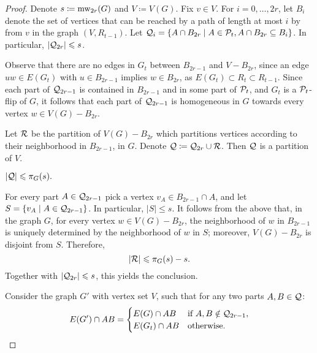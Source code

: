     
        \begin{proof}Denote $s\coloneqq \mw_{2r}(G)$ and $V\coloneqq V(G)$.
            Fix $v\in V$. 
            For $i=0,\ldots,2r$, let 
            $B_i$ denote the set of vertices  that can be reached by a path of length at most $i$ by from $v$ in the graph $(V,R_{t-1})$.
            Let $\cal Q_i=\setof{A\cap B_{2r}}{A\in\cal P_t,A\cap B_{2r}\subset B_i}$.
    In particular, $|\cal Q_{2r}|\le s$.
    
    
    Observe that
    there are no edges in $G_{t}$ between  $B_{2r-1}$ and $V-B_{2r}$,
    since an edge  $uw\in E(G_t)$ with  $u\in B_{2r-1}$  implies $w\in B_{2r}$,
    as $E(G_{t})\subset R_t\subset R_{t-1}$.
    Since each part of $\cal Q_{2r-1}$ is contained in $B_{2r-1}$ and in some part of $\cal P_t$,
     and $G_t$ is a $\cal P_t$-flip of $G$, 
    it follows that each part of $\cal Q_{2r-1}$ is homogeneous in $G$ towards 
    every vertex $w\in V(G)-B_{2r}$.
    
    
    Let $\cal R$ be the partition of $V(G)-B_{2r}$ which partitions vertices according to their neighborhood in $B_{2r-1}$, in $G$.
    Denote $\cal Q\coloneqq \cal Q_{2r}\cup\cal R$. Then $\cal Q$ is a partition of $V$.
    
    \begin{claim}\label{cl:small-q-poly}
        $|\cal Q|\le \pi_G(s).$
       \end{claim}
       \begin{claimproof}
           For every part $A\in \cal Q_{2r-1}$ pick a vertex $v_A\in B_{2r-1}\cap A$,
           and let $S=\setof{v_A}{A\in\cal Q_{2r-1}}$. In particular, $|S|\le s$.
           It follows from the above that, in the graph $G$, for every vertex $w\in V(G)-B_{2r}$,
           the neighborhood  of $w$ in $B_{2r-1}$ is uniquely determined by the neighborhood of $w$ in $S$; moreover, $V(G)-B_{2r}$ is disjoint from $S$.
           Therefore, $$|\cal R|\le  \pi_G(s)-s.$$
           Together with $|\cal Q_{2r}|\le s$, this yields the conclusion.
       \end{claimproof}
           
    
    Consider the graph $G'$ with vertex set $V$,
    such that for any two parts $A,B\in\cal Q$:
    $$E(G')\cap AB=
    \begin{cases}
        E(G)\cap AB&\text{if $A,B\notin \cal Q_{2r-1}$},\\
        E(G_t)\cap AB&\text{otherwise.}\\
    \end{cases}$$
    

\end{proof}
